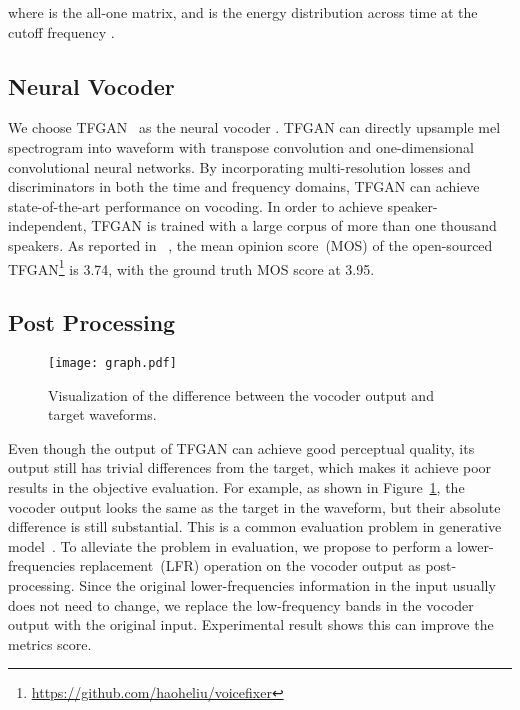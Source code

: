 \documentclass[a4paper]{article}
\def\Figref#1{Figure~\ref{#1}}
\begin{document}
where  is the all-one matrix, and  is the energy distribution across time at the cutoff frequency .



\subsection{Neural Vocoder}

We choose TFGAN~\cite{tian2020tfgan} as the neural vocoder . TFGAN can directly upsample mel spectrogram into waveform with transpose convolution and one-dimensional convolutional neural networks. By incorporating multi-resolution losses and discriminators in both the time and frequency domains, TFGAN can achieve state-of-the-art performance on vocoding. In order to achieve speaker-independent, TFGAN is trained with a large corpus of more than one thousand speakers. As reported in ~\cite{liu2021voicefixer}, the mean opinion score~(MOS) of the open-sourced TFGAN\footnote{\url{https://github.com/haoheliu/voicefixer}} is \num{3.74}, with the ground truth MOS score at \num{3.95}.

\subsection{Post Processing} 

\begin{figure}[htbp] \centering
  \texttt{[image: graph.pdf]}
  \caption{Visualization of the difference between the vocoder output and target waveforms.}
  \label{fig-postprocess-method}
\end{figure}

Even though the output of TFGAN can achieve good perceptual quality, its output still has trivial differences from the target, which makes it achieve poor results in the objective evaluation. For example, as shown in \Figref{fig-postprocess-method}, the vocoder output looks the same as the target in the waveform, but their absolute difference is still substantial. This is a common evaluation problem in generative model~\cite{nu-gan-kumar2020nu, liu2019speech, liu2021conditional}. To alleviate the problem in evaluation, we propose to perform a lower-frequencies replacement~(LFR) operation on the vocoder output as post-processing. Since the original lower-frequencies information in the input usually does not need to change, we replace the low-frequency bands in the vocoder output with the original input. Experimental result shows this can improve the metrics score.
\end{document}
